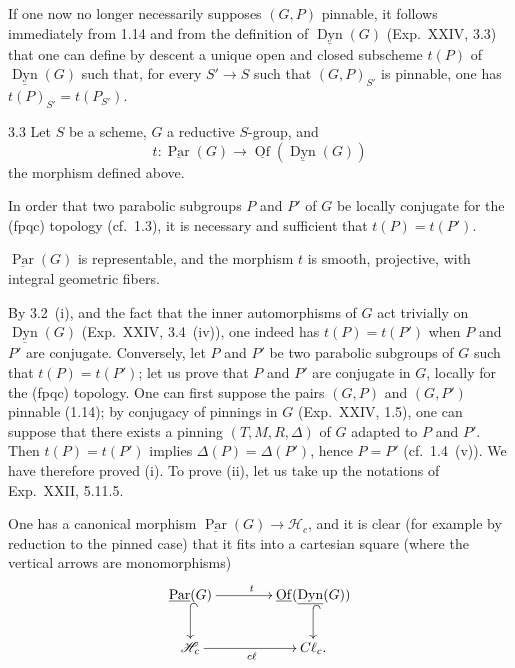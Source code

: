 If one now no longer necessarily supposes $(G,P)$ pinnable, it follows immediately from 1.14 and from the definition of $\underline{\operatorname{Dyn}}(G)$ (Exp.~XXIV, 3.3) that one can define by descent a unique open and closed subscheme $t(P)$ of $\underline{\operatorname{Dyn}}(G)$ such that, for every $S'\to S$ such that $(G,P)_{S'}$ is pinnable, one has $t(P)_{S'}=t(P_{S'})$.
\begin{theorem}{3.3}\label{XXVI.3.3}
Let $S$ be a scheme, $G$ a reductive $S$-group, and
\[
t:\underline{\operatorname{Par}}(G)\to\underline{\operatorname{Of}}(\underline{\operatorname{Dyn}}(G))
\]
the morphism defined above.
\begin{enumeratei}
\item In order that two parabolic subgroups $P$ and $P'$ of $G$ be locally conjugate for the (fpqc) topology (cf.~1.3), it is necessary and sufficient that $t(P)=t(P')$.
\item $\underline{\operatorname{Par}}(G)$ is representable, and the morphism $t$ is smooth, projective, with integral geometric fibers.
\end{enumeratei}
\end{theorem}
By 3.2~(i), and the fact that the inner automorphisms of $G$ act trivially on $\underline{\operatorname{Dyn}}(G)$ (Exp.~XXIV, 3.4~(iv)), one indeed has $t(P)=t(P')$ when $P$ and $P'$ are conjugate. Conversely, let $P$ and $P'$ be two parabolic subgroups of $G$ such that $t(P)=t(P')$; let us prove that $P$ and $P'$ are conjugate in $G$, locally for the (fpqc) topology. One can first suppose the pairs $(G,P)$ and $(G,P')$ pinnable (1.14); by conjugacy of pinnings in $G$ (Exp.~XXIV, 1.5), one can suppose that there exists a pinning $(T,M,R,\Delta)$ of $G$ adapted to $P$ and $P'$. Then $t(P)=t(P')$ implies $\Delta(P)=\Delta(P')$, hence $P=P'$ (cf.~1.4~(v)). We have therefore proved (i). To prove (ii), let us take up the notations of Exp.~XXII, 5.11.5.

One has a canonical morphism $\underline{\operatorname{Par}}(G)\to\mathscr H_c$, and it is clear (for example by reduction to the pinned case) that it fits into a cartesian square (where the vertical arrows are monomorphisms)
\[
\xymatrix@C=40pt@R=22pt{
\underline{\operatorname{Par}}(G)\ar[r]^t\ar@{^{(}->}[d]&\underline{\operatorname{Of}}(\underline{\operatorname{Dyn}}(G))\ar@{^{(}->}[d]\\
\mathscr H_c\ar[r]_{c\ell}&C\ell_c.
}
\]
